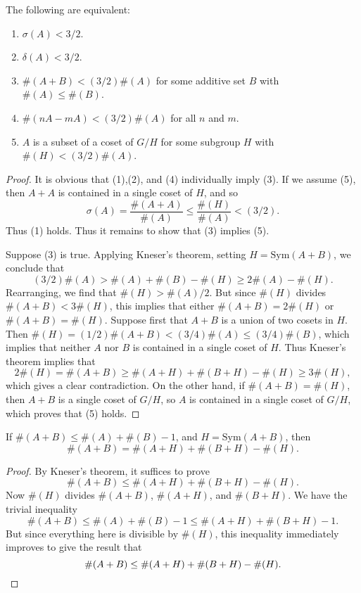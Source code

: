 \begin{corollary}
    The following are equivalent:
    \begin{enumerate}
        \item $\sigma(A) < 3/2$.
        \item $\delta(A) < 3/2$.
        \item $\#(A + B) < (3/2) \#(A)$ for some additive set $B$ with $\#(A) \leq \#(B)$.
        \item $\#(nA - mA) < (3/2) \#(A)$ for all $n$ and $m$.
        \item $A$ is a subset of a coset of $G/H$ for some subgroup $H$ with $\#(H) < (3/2) \#(A)$.
    \end{enumerate}
\end{corollary}
\begin{proof}
    It is obvious that (1),(2), and (4) individually imply (3). If we assume (5), then $A + A$ is contained in a single coset of $H$, and so
    \[ \sigma(A) = \frac{\#(A + A)}{\#(A)} \leq \frac{\#(H)}{\#(A)} < (3/2). \]
    Thus (1) holds. Thus it remains to show that (3) implies (5).

    Suppose (3) is true. Applying Kneser's theorem, setting $H = \text{Sym}(A+B)$, we conclude that
    \[ (3/2) \#(A) > \#(A) + \#(B) - \#(H) \geq 2 \#(A) - \#(H). \]
    Rearranging, we find that $\#(H) > \#(A) / 2$. But since $\#(H)$ divides $\#(A + B) < 3 \#(H)$, this implies that either $\#(A + B) = 2\#(H)$ or $\#(A + B) = \#(H)$. Suppose first that $A + B$ is a union of two cosets in $H$. Then $\#(H) = (1/2) \#(A + B) < (3/4) \#(A) \leq (3/4) \#(B)$, which implies that neither $A$ nor $B$ is contained in a single coset of $H$. Thus Kneser's theorem implies that
    \[ 2 \#(H) = \#(A + B) \geq \#(A + H) + \#(B + H) - \#(H) \geq 3\#(H), \]
    which gives a clear contradiction. On the other hand, if $\#(A + B) = \#(H)$, then $A + B$ is a single coset of $G/H$, so $A$ is contained in a single coset of $G/H$, which proves that (5) holds.
\end{proof}

\begin{corollary}
    If $\#(A + B) \leq \#(A) + \#(B) - 1$, and $H = \text{Sym}(A + B)$, then
    \[ \#(A + B) = \#(A + H) + \#(B + H) - \#(H). \]
\end{corollary}
\begin{proof}
    By Kneser's theorem, it suffices to prove
    \[ \#(A + B) \leq \#(A + H) + \#(B + H) - \#(H). \]
    Now $\#(H)$ divides $\#(A + B)$, $\#(A + H)$, and $\#(B+H)$. We have the trivial inequality
    \[ \#(A + B) \leq \#(A) + \#(B) - 1 \leq \#(A + H) + \#(B + H) - 1. \]
    But since everything here is divisible by $\#(H)$, this inequality immediately improves to give the result that
    \[ \#(A + B) \leq \#(A + H) + \#(B + H) - \#(H). \qedhere \]
\end{proof}

